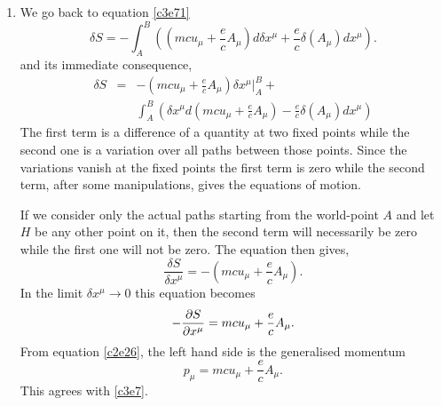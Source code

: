 \begin{enumerate}
\item We go back to equation \eqref{c3e71}
\[
\delta S = -\int_A^B\left((mcu_\mu + \frac{e}{c}A_\mu)d\delta x^\mu + 
\frac{e}{c}\delta(A_\mu) dx^\mu\right).
\]
and its immediate consequence,
\begin{eqnarray*}
\delta S &=& -\left(mcu_\mu + \frac{e}{c}A_\mu\right)\delta x^\mu\Big|_A^B + \\
  & & \int_A^B \left(\delta x^\mu d\left(mcu_\mu + \frac{e}{c}A_\mu\right) - 
 \frac{e}{c}\delta(A_\mu) dx^\mu\right)
\end{eqnarray*}
The first term is a difference of a quantity at two fixed points while the 
second one is a variation over all paths between those points. Since the 
variations vanish at the fixed points the first term is zero while the second 
term, after some manipulations, gives the equations of motion.

If we consider only the actual paths starting from the world-point $A$ and let 
$H$ be any other point on it, then the second term will necessarily be zero 
while the first one will not be zero. The equation then gives,
\[
\frac{\delta S}{\delta x^\mu} = -\left(mcu_\mu + \frac{e}{c}A_\mu\right).
\]
In the limit $\delta x^\mu \rightarrow 0$ this equation becomes
\begin{equation}\label{c3e78}
-\frac{\partial{S}}{\partial{x^\mu}} = mcu_\mu + \frac{e}{c}A_\mu.
\end{equation}
From equation \eqref{c2e26}, the left hand side is the generalised momentum
\begin{equation}\label{c3e79}
p_\mu = mcu_\mu + \frac{e}{c}A_\mu.
\end{equation}
This agrees with \eqref{c3e7}.


\end{enumerate}
